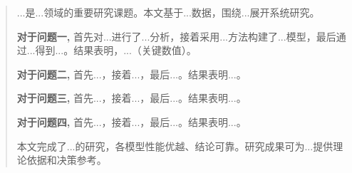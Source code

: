 
\begin{abstract}

...是...领域的重要研究课题。本文基于...数据，围绕...展开系统研究。

\textbf{对于问题一,} 首先对...进行了...分析，接着采用...方法构建了...模型，最后通过...得到...。结果表明，...（关键数值）。

\textbf{对于问题二,} 首先...，接着...，最后...。结果表明...。

\textbf{对于问题三,} 首先...，接着...，最后...。结果表明...。

\textbf{对于问题四,} 首先...，接着...，最后...。结果表明...。

本文完成了...的研究，各模型性能优越、结论可靠。研究成果可为...提供理论依据和决策参考。


\end{abstract}
